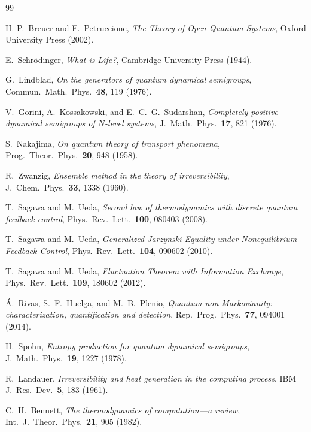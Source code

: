\documentclass[12pt]{article}
\begin{document}
\begin{thebibliography}{99}

H.-P.~Breuer and F.~Petruccione,
\emph{The Theory of Open Quantum Systems},
Oxford University Press (2002).

E.~Schr\"odinger,
\emph{What is Life?},
Cambridge University Press (1944).

G.~Lindblad,
\emph{On the generators of quantum dynamical semigroups},
Commun.\ Math.\ Phys.\ \textbf{48}, 119 (1976).

V.~Gorini, A.~Kossakowski, and E.~C.~G.~Sudarshan,
\emph{Completely positive dynamical semigroups of $N$-level systems},
J.\ Math.\ Phys.\ \textbf{17}, 821 (1976).

S.~Nakajima,
\emph{On quantum theory of transport phenomena},
Prog.\ Theor.\ Phys.\ \textbf{20}, 948 (1958).

R.~Zwanzig,
\emph{Ensemble method in the theory of irreversibility},
J.\ Chem.\ Phys.\ \textbf{33}, 1338 (1960).

T.~Sagawa and M.~Ueda,
\emph{Second law of thermodynamics with discrete quantum feedback control},
Phys.\ Rev.\ Lett.\ \textbf{100}, 080403 (2008).

T.~Sagawa and M.~Ueda,
\emph{Generalized Jarzynski Equality under Nonequilibrium Feedback Control},
Phys.\ Rev.\ Lett.\ \textbf{104}, 090602 (2010).

T.~Sagawa and M.~Ueda,
\emph{Fluctuation Theorem with Information Exchange},
Phys.\ Rev.\ Lett.\ \textbf{109}, 180602 (2012).

\'{A}.~Rivas, S.~F.~Huelga, and M.~B.~Plenio,
\emph{Quantum non-Markovianity: characterization, quantification and detection},
Rep.\ Prog.\ Phys.\ \textbf{77}, 094001 (2014).

H.~Spohn,
\emph{Entropy production for quantum dynamical semigroups},
J.\ Math.\ Phys.\ \textbf{19}, 1227 (1978).

R.~Landauer,
\emph{Irreversibility and heat generation in the computing process},
IBM J.\ Res.\ Dev.\ \textbf{5}, 183 (1961).

C.~H.~Bennett,
\emph{The thermodynamics of computation---a review},
Int.\ J.\ Theor.\ Phys.\ \textbf{21}, 905 (1982).


\end{thebibliography}
\end{document}
